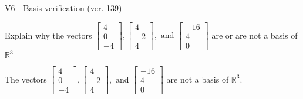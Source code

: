 \begin{exercise}
  \begin{exerciseTitle}V6 - Basis verification (ver. 139)\end{exerciseTitle}
  \begin{exerciseStatement}
    Explain why the vectors \(\left[\begin{array}{r}
4 \\
0 \\
-4
\end{array}\right] , \left[\begin{array}{r}
4 \\
-2 \\
4
\end{array}\right] , \text{ and } \left[\begin{array}{r}
-16 \\
4 \\
0
\end{array}\right]\) are or are not a basis of \(\mathbb{R}^3\)	


  \end{exerciseStatement}
  \begin{exerciseAnswer}
   The vectors \(\left[\begin{array}{r}
4 \\
0 \\
-4
\end{array}\right] , \left[\begin{array}{r}
4 \\
-2 \\
4
\end{array}\right] , \text{ and } \left[\begin{array}{r}
-16 \\
4 \\
0
\end{array}\right]\) 
  	 are not  a basis of \(\mathbb{R}^3\).
  


  \end{exerciseAnswer}
\end{exercise}